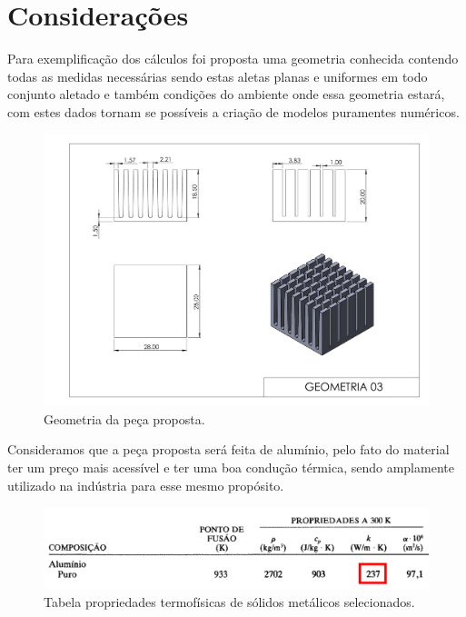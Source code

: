\chapter{Considerações}\label{cap:definitions}

Para exemplificação dos cálculos foi proposta uma geometria conhecida contendo todas as medidas necessárias sendo estas aletas planas e uniformes em todo conjunto aletado e também condições do ambiente onde essa geometria estará, com estes dados tornam se possíveis a criação de modelos puramentes numéricos.

\begin{figure}[h]
    \centering
    \caption{Geometria da peça proposta.}
    \label{fig:geometry}
    \includegraphics[width=15cm]{figuras/geometria.pdf}
\end{figure}

Consideramos que a peça proposta será feita de alumínio, pelo fato do material ter um preço mais acessível e ter uma boa condução térmica, sendo amplamente utilizado na indústria para esse mesmo propósito.

\begin{figure}[h]
    \centering
    \caption{Tabela propriedades termofísicas de sólidos metálicos selecionados.}
    \label{fig:metalProps}
    \includegraphics[width=12cm]{figuras/metalProps.jpg}
\end{figure}

